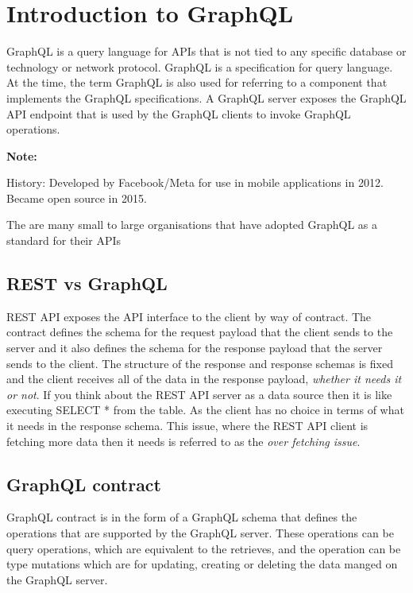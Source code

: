\documentclass[a4paper, 11pt]{book}
\newenvironment{note}{
    \begin{siderule}
        \textbf{Note: }
        }{
    \end{siderule}
}
\begin{document}

    \section{Introduction to GraphQL}

    GraphQL is a query language for APIs that is not tied to any specific database or technology or network protocol.
    GraphQL is a specification for query language.
    At the time, the term GraphQL is also used for referring to a component that implements the GraphQL specifications.
    A GraphQL server exposes the GraphQL API endpoint that is used by the GraphQL clients to invoke GraphQL operations.

    \begin{note}
        History: Developed by Facebook/Meta for use in mobile applications in 2012. Became open source in 2015.
    \end{note}

    The are many small to large organisations that have adopted GraphQL as a standard for their APIs

    \subsection{REST vs GraphQL}
    REST API exposes the API interface to the client by way of contract.
    The contract defines the schema for the request payload that the client sends to the server and it also defines the schema for the response payload that the server sends to the client.
    The structure of the response and response schemas is fixed and the client receives all of the data in the response payload, \textit{whether it needs it or not}.
    If you think about the REST API server as a data source then it is like executing SELECT * from the table.
    As the client has no choice in terms of what it needs in the response schema.
    This issue, where the REST API client is fetching more data then it needs is referred to as the \textit{over fetching issue}.

    \subsection{GraphQL contract}
    GraphQL contract is in the form of a GraphQL schema that defines the operations that are supported by the GraphQL server.
    These operations can be query operations, which are equivalent to the retrieves, and the operation can be type mutations which are for updating, creating or deleting the data manged on the GraphQL server.
\end{document}
